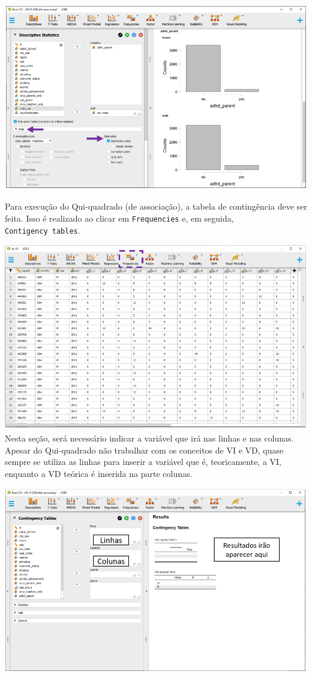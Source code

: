 \documentclass[
]{book}
\begin{document}
\includegraphics{./img/cap_x2_grafico.png}

Para execução do Qui-quadrado (de associação), a tabela de contingência deve ser feita. Isso é realizado ao clicar em \texttt{Frequencies} e, em seguida, \texttt{Contigency\ tables}.

\includegraphics{./img/cap_x2_interface.png}
Nesta seção, será necessário indicar a variável que irá nas linhas e nas colunas. Apesar do Qui-quadrado não trabalhar com os conceitos de VI e VD, quase sempre se utiliza as linhas para inserir a variável que é, teoricamente, a VI, enquanto a VD teórica é inserida na parte colunas.

\includegraphics{./img/cap_x2_interface2.png}
\end{document}
